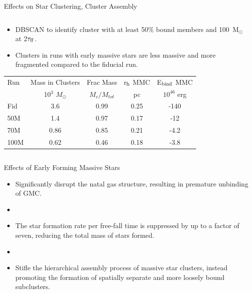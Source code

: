 \documentclass[aspectratio=169]{beamer}
\begin{document}
\begin{frame}{Effects on Star Clustering, Cluster Assembly}{}
\begin{columns}
\begin{column}{0.45\textwidth}
            \begin{itemize}
              \item DBSCAN to identify cluster with at least 50\% bound members and 100~M$_\odot$ at 2$\tau_{\rm ff}$.
              \item Clusters in runs with early massive stars are less massive and more fragmented compared to the fiducial run.  
            \end{itemize}
	    \begin{table}[!htb]
            	\tiny
 		\label{tab:cluster_stats_2tff}
 		\begin{tabular}{lcccc} 
  			\hline
  			Run & Mass in Clusters & Frac Mass & r$_{\rm h}$ MMC & E$_{\rm bind}$ MMC \\
  			& 10$^3$ $M_{\odot}$ & $M_{c}/M_{tot}$ & pc & $10^{46}$ erg\\
  			\hline
  			Fid & 3.6 & 0.99 & 0.25 & -140 \\
  			50M & 1.4 & 0.97 & 0.17 & -12 \\
  			70M & 0.86 & 0.85 & 0.21 & -4.2 \\
  			100M & 0.62 & 0.46 & 0.18 & -3.8 \\
  			\hline
 		\end{tabular}
	    \end{table}
        \end{column}
    \end{columns}
\end{frame} 



\begin{frame}{Effects of Early Forming Massive Stars}{}
    \begin{itemize}
        \item Significantly disrupt the natal gas structure, resulting in premature unbinding of GMC.
        \item []
        \item The star formation rate per free-fall time is suppressed by up to a factor of seven, reducing the total mass of stars formed.
        \item []
        \item Stifle the hierarchical assembly process of massive star clusters, instead promoting the formation of spatially separate and more loosely bound subclusters.
    \end{itemize}
\end{frame}
\end{document}

